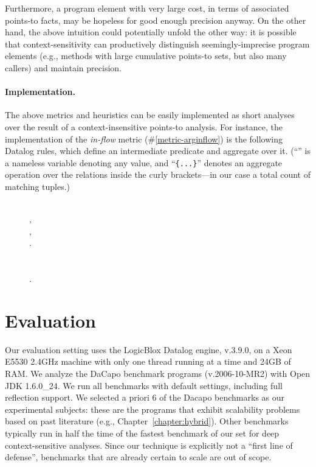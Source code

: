 Furthermore, a program element with very large cost, in terms of associated points-to facts, may be hopeless for good enough precision anyway. On the other hand, the above intuition could potentially unfold the other way: it is possible that context-sensitivity can productively distinguish seemingly-imprecise program elements (e.g., methods with large cumulative points-to sets, but also many callers) and maintain precision.

\paragraph*{Implementation.}
The above metrics and heuristics can be easily implemented as short analyses over the result of a context-insensitive points-to analysis. For instance, the implementation of the \emph{in-flow} metric (\#\ref{metric-arginflow}) is the following Datalog rules, which define an intermediate predicate and aggregate over it. (``\args{\_}'' is a nameless variable denoting any value, and ``\texttt{\{...\}}'' denotes an aggregate operation over the relations inside the curly brackets---in our case a total count of matching tuples.)

\begin{figure}[h]
\begin{datalog}
 \dlIf{} \\
    ,\\
    ,\\
    .\\
\\
 \dlIf{} \\
    .
\end{datalog}
\end{figure}




\section{Evaluation}

Our evaluation setting uses the \todo{} LogicBlox Datalog engine, v.3.9.0, on a Xeon E5530 2.4GHz machine with only one thread running at a time and 24GB of RAM. We analyze the DaCapo benchmark programs (v.2006-10-MR2) with Open JDK 1.6.0\_24. We run all benchmarks with default \doop{} settings, including full reflection support. We selected a priori 6 of the Dacapo benchmarks as our experimental subjects: these are the programs that exhibit scalability problems based on past literature (e.g., Chapter~\ref{chapter:hybrid}). Other benchmarks typically run in half the time of the fastest benchmark of our set for deep context-sensitive analyses. Since our technique is explicitly not a ``first line of defense'', benchmarks that are already certain to scale are out of scope.


